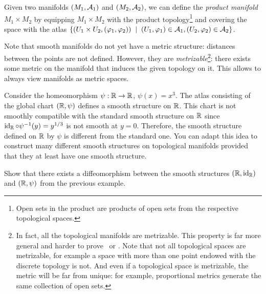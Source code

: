 \begin{example}\label{ex:pm}
Given two manifolds $(M_1, \mathcal{A}_1)$ and $(M_2, \mathcal{A}_2)$, we can define the \emph{product manifold} $M_1 \times M_2$ by equipping $M_1 \times M_2$ with the product topology\footnote{Open sets in the product are products of open sets from the respective topological spaces.} and covering the space with the atlas $\{ (U_1\times U_2, (\varphi_1, \varphi_2)) \;\mid\; (U_1, \varphi_1)\in\mathcal{A}_1, (U_2, \varphi_2)\in \mathcal{A}_2\}$.
\end{example}

Note that smooth manifolds do not yet have a metric structure: distances between the points are not defined.
However, they are \emph{metrizable}\footnote{In fact, all the topological manifolds are metrizable. This property is far more general and harder to prove~\cite[Theorem 34.1 and Exercise 1 of Chapter 4.36]{book:munkres:topology} or \cite{nlab:urysohn_metrization_theorem}. Note that not all topological spaces are metrizable, for example a space with more than one point endowed with the discrete topology is not. And even if a topological space is metrizable, the metric will be far from unique: for example, proportional metrics generate the same collection of open sets.}: there exists some metric on the manifold that induces the given topology on it.
This allows to always view manifolds as metric spaces.

\begin{example}
  Consider the homeomorphism $\psi:\mathbb{R}\to\mathbb{R}$, $\psi(x) = x^3$.
  The atlas consisting of the global chart $(\mathbb{R}, \psi)$ defines a smooth structure on $\mathbb{R}$.
  This chart is not smoothly compatible with the standard smooth structure on $\mathbb{R}$ since $\operatorname{id}_{\mathbb{R}} \circ \psi^{-1} (y) = y^{1/3}$ is not smooth at $y=0$.
  Therefore, the smooth structure defined on $\mathbb{R}$ by $\psi$ is different from the standard one.
  You can adapt this idea to construct many different smooth structures on topological manifolds provided that they at least have one smooth structure.
\end{example}

\begin{exercise}
  Show that there exists a diffeomorphism between the smooth structures $(\mathbb{R}, \operatorname{id}_{\mathbb{R}})$ and $(\mathbb{R}, \psi)$ from the previous example.
\end{exercise}

